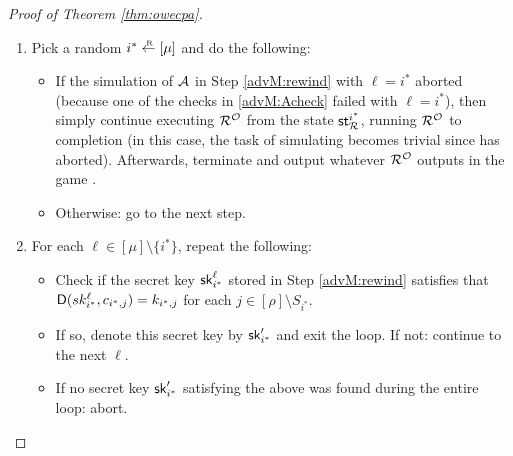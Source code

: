 \begin{proof}[Proof of Theorem \ref{thm:owecpa}]
\begin{enumerate}[itemsep=0.1cm]
\begin{itemize}[label={\textbullet},itemsep=0.1cm]
\begin{enumerate}[topsep=0.1cm,itemsep=0.1cm,ref=(\alph*)]
                          storing the resulting secret keys as \((\sk_{i}^{\ell})_{i \in [\mu] \setminus \{\ell\}}\).
                    \item\label{advM:Acheck} For each \(i \ne \ell\),
                          aborting the simulation of \advA if
                          \(\Decaps(\sk_{i}^{\ell},c_{i,j}) \ne k_{i,j}\) for some \(j \in [\rho] \setminus S_{i}\).
                  \end{enumerate}
            \item Denote the state of \(\redR^{\oracle}\) after this point by \(\state_{\redR}^{\ell}\).
          \end{itemize}
    \item\label{advM:sample} Pick a random \(i^{*} \sampleR [\mu]\) and do the following:
        \begin{itemize}[label={\textbullet},itemsep=0.1cm]
          \item If the simulation of \(\mathcal{A}\) in Step \ref{advM:rewind} with \(\ell = i^{*}\)
                aborted (because one of the checks in \ref{advM:Acheck} failed with \(\ell = i^{*}\)),
                then simply continue executing \(\redR^{\oracle}\)
                from the state \(\state_{\redR}^{i^{*}}\), running \(\redR^{\oracle}\) to completion
                (in this case, the task of simulating \advA becomes trivial since \advA has aborted).
                Afterwards, terminate and output whatever \(\redR^{\oracle}\) outputs in the game \SICA.
          \item Otherwise: go to the next step.
        \end{itemize}
    \item\label{advM:key} For each \(\ell \in [\mu] \setminus \{i^{*}\}\), repeat the following:
          \begin{itemize}[label={\textbullet},itemsep=0.1cm]
            \item Check if the secret key \(\mathsf{sk}_{i^{*}}^{\ell}\)
                  stored in Step \ref{advM:rewind} satisfies that
                  \(\mathsf{D}(sk_{i^{*}}^{\ell},c_{i^{*},j}) = k_{i^{*},j}\)
                  for each \(j \in [\rho] \setminus S_{i^{*}}\).
            \item If so, denote this secret key by \(\mathsf{sk}_{i^{*}}'\) and exit the loop.
                  If not: continue to the next \(\ell\).
            \item If no secret key \(\mathsf{sk}_{i^{*}}'\) satisfying the above
                  was found during the entire loop: abort.
          \end{itemize}

\end{enumerate}
\end{proof}
